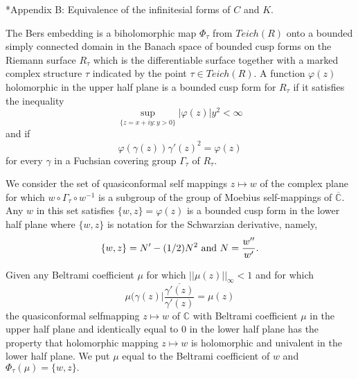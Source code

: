 \documentclass[12pt]{amsart}
\theoremstyle{remark}
\theoremstyle{definition}
\theoremstyle{definition}
\begin{document}
\begin{section}*{Appendix B: Equivalence of the infinitesial forms of $C$ and $K.$}

    
 The Bers embedding is a biholomorphic map 
 $\Phi_{\tau}$ from $Teich(R)$ onto a bounded simply connected domain  in the Banach space of bounded cusp forms on the Riemann surface $R_{\tau}$ which is the differentiable surface together with a marked  complex structure $\tau$ indicated by the point $\tau \in Teich(R).$  A function 
 $\varphi(z)$ holomorphic in the upper half plane is a bounded cusp form for $R_{\tau}$ if it satisfies the inequality 
 $$ \sup_{\{z=x+iy: y>0\}} |\varphi(z)|  y^2< \infty$$
 and if $$\varphi(\gamma(z))\gamma'(z)^2 = \varphi(z)$$
 for every $\gamma$ in a Fuchsian covering group $\Gamma_{\tau}$ of $R_{\tau}.$
 
 We consider the set of quasiconformal self mappings  $z \mapsto w$ of the complex plane for which 
 $w \circ \Gamma_{\tau} \circ w^{-1}$ is a subgroup of the group of Moebius self-mappings of $\overline{\mathbb C}.$   Any $w$ in this set satisfies
 $\{w,z\} = \varphi(z)$ is a bounded cusp form in the lower half plane where
 $\{w,z\}$ is notation for the Schwarzian derivative, namely, 
 $$\{w,z\} = N' - (1/2) N^2 {\rm \ and \ } N= \frac{w''}{w'}.$$
 
 
 
 
 
 Given any Beltrami coefficient $\mu$ for which $||\mu(z)||_{\infty} < 1$ and for which
 $$\mu(\gamma(z)| \frac{\overline{\gamma'(z)}}{\gamma'(z)} = \mu(z)$$ the quasiconformal selfmapping $z \mapsto w$ of ${\mathbb C}$ with Beltrami coefficient $\mu$ in the upper half plane and identically equal to $0$ in the lower half plane has the property that  holomorphic 
 mapping $z \mapsto w$ is holomorphic and univalent in the lower half plane.
 We put $\mu$ equal to the Beltrami coefficient of $w$ and $\Phi_{\tau}(\mu)=\{w,z\}.$
 

\end{section}
\end{document}
